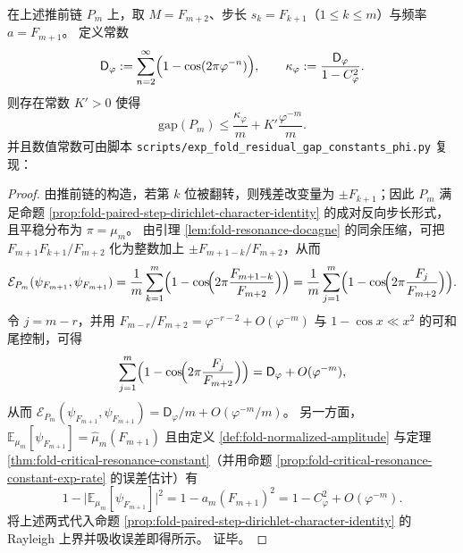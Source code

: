 \begin{corollary}\label{cor:fold-residual-pushforward-gap-upper-bound}
在上述推前链 \(P_m\) 上，取 \(M=F_{m+2}\)、步长 \(s_k=F_{k+1}\)（\(1\le k\le m\)）与频率 \(a=F_{m+1}\)。
定义常数
\[
\mathsf D_\varphi:=\sum_{n=2}^{\infty}\Bigl(1-\cos(2\pi\varphi^{-n})\Bigr),
\qquad
\kappa_\varphi:=\frac{\mathsf D_\varphi}{1-C_\varphi^2}.
\]
则存在常数 \(K'>0\) 使得
\[
\mathrm{gap}(P_m)\le \frac{\kappa_\varphi}{m}+K'\frac{\varphi^{-m}}{m}.
\]
并且数值常数可由脚本 \texttt{scripts/exp\_fold\_residual\_gap\_constants\_phi.py} 复现：

\end{corollary}

\begin{proof}
由推前链的构造，若第 \(k\) 位被翻转，则残差改变量为 \(\pm F_{k+1}\)；因此 \(P_m\) 满足命题 \ref{prop:fold-paired-step-dirichlet-character-identity} 的成对反向步长形式，且平稳分布为 \(\pi=\mu_m\)。
由引理 \ref{lem:fold-resonance-docagne} 的同余压缩，可把
\(
F_{m+1}F_{k+1}/F_{m+2}
\)
化为整数加上 \(\pm F_{m+1-k}/F_{m+2}\)，从而
\[
\mathcal E_{P_m}(\psi_{F_{m+1}},\psi_{F_{m+1}})
=\frac{1}{m}\sum_{k=1}^m\Bigl(1-\cos\!\Bigl(2\pi\frac{F_{m+1-k}}{F_{m+2}}\Bigr)\Bigr)
=\frac{1}{m}\sum_{j=1}^m\Bigl(1-\cos\!\Bigl(2\pi\frac{F_{j}}{F_{m+2}}\Bigr)\Bigr).
\]
令 \(j=m-r\)，并用 \(F_{m-r}/F_{m+2}=\varphi^{-r-2}+O(\varphi^{-m})\) 与 \(1-\cos x\ll x^2\) 的可和尾控制，可得
\[
\sum_{j=1}^m\Bigl(1-\cos\!\Bigl(2\pi\frac{F_{j}}{F_{m+2}}\Bigr)\Bigr)
=\mathsf D_\varphi+O(\varphi^{-m}),
\]
从而 \(\mathcal E_{P_m}(\psi_{F_{m+1}},\psi_{F_{m+1}})=\mathsf D_\varphi/m+O(\varphi^{-m}/m)\)。
另一方面，
\(
\mathbb E_{\mu_m}[\psi_{F_{m+1}}]=\widehat\mu_m(F_{m+1})
\)
且由定义 \ref{def:fold-normalized-amplitude} 与定理 \ref{thm:fold-critical-resonance-constant}（并用命题 \ref{prop:fold-critical-resonance-constant-exp-rate} 的误差估计）有
\[
1-\bigl|\mathbb E_{\mu_m}[\psi_{F_{m+1}}]\bigr|^2
=1-a_m(F_{m+1})^2
=1-C_\varphi^2+O(\varphi^{-m}).
\]
将上述两式代入命题 \ref{prop:fold-paired-step-dirichlet-character-identity} 的 Rayleigh 上界并吸收误差即得所示。
证毕。
\end{proof}

